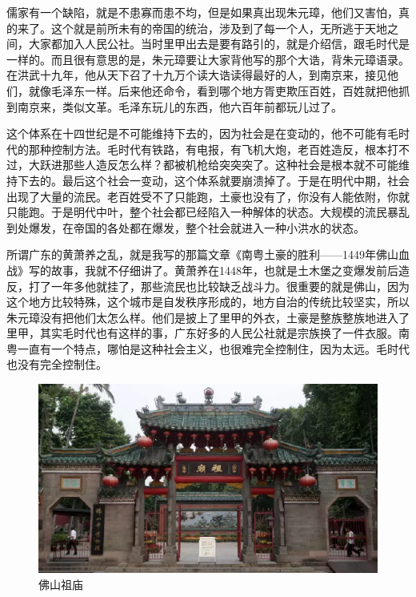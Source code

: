 儒家有一个缺陷，就是不患寡而患不均，但是如果真出现朱元璋，他们又害怕，真的来了。这个就是前所未有的帝国的统治，涉及到了每一个人，无所逃于天地之间，大家都加入人民公社。当时里甲出去是要有路引的，就是介绍信，跟毛时代是一样的。而且很有意思的是，朱元璋要让大家背他写的那个大诰，背朱元璋语录。在洪武十九年，他从天下召了十九万个读大诰读得最好的人，到南京来，接见他们，就像毛泽东一样。后来他还命令，看到哪个地方胥吏欺压百姓，百姓就把他抓到南京来，类似文革。毛泽东玩儿的东西，他六百年前都玩儿过了。

这个体系在十四世纪是不可能维持下去的，因为社会是在变动的，他不可能有毛时代的那种控制方法。毛时代有铁路，有电报，有飞机大炮，老百姓造反，根本打不过，大跃进那些人造反怎么样？都被机枪给突突突了。这种社会是根本就不可能维持下去的。最后这个社会一变动，这个体系就要崩溃掉了。于是在明代中期，社会出现了大量的流民。老百姓受不了只能跑，土豪也没有了，你没有人能依附，你就只能跑。于是明代中叶，整个社会都已经陷入一种解体的状态。大规模的流民暴乱到处爆发，在帝国的各处都在爆发，整个社会就进入一种小洪水的状态。

所谓广东的黄萧养之乱，就是我写的那篇文章《南粤土豪的胜利——1449年佛山血战》写的故事，我就不仔细讲了。黄萧养在1448年，也就是土木堡之变爆发前后造反，打了一年多他就挂了，那些流民也比较缺乏战斗力。很重要的就是佛山，因为这个地方比较特殊，这个城市是自发秩序形成的，地方自治的传统比较坚实，所以朱元璋没有把他们太怎么样。他们是披上了里甲的外衣，土豪是整族整族地进入了里甲，其实毛时代也有这样的事，广东好多的人民公社就是宗族换了一件衣服。南粤一直有一个特点，哪怕是这种社会主义，也很难完全控制住，因为太远。毛时代也没有完全控制住。

\begin{figure}
	\centering
	\includegraphics[width=\textwidth]{images/image-48}
	\caption{佛山祖庙}
\end{figure}


